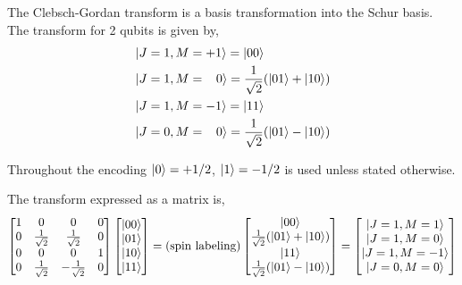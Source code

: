 \documentclass[12pt]{article}
\begin{document}
The Clebsch-Gordan transform is a basis transformation into the Schur basis. The transform for 2 qubits is given by,
\begin{subequations}
\begin{align}
\begin{split}
&\left\vert{J=1, M=+1}\right\rangle = \left\vert{00}\right\rangle \\
&\left\vert{J=1, M=\;\;\;0}\right\rangle = \frac{1}{\sqrt{2}}(\left\vert{01}\right\rangle + \left\vert{10}\right\rangle) \\
&\left\vert{J=1, M=-1}\right\rangle = \left\vert{11}\right\rangle \\
\end{split}\\
\begin{split}
&\left\vert{J=0, M=\;\;\;0}\right\rangle = \frac{1}{\sqrt{2}}(\left\vert{01}\right\rangle - \left\vert{10}\right\rangle)\\
\end{split}
\end{align}
\end{subequations}

Throughout the encoding $\left\vert{0}\right\rangle=+1/2$, $\left\vert{1}\right\rangle=-1/2$ is used unless stated otherwise.

The transform expressed as a matrix is,
\begin{align}
\begin{bmatrix}
1 & 0 & 0 & 0 \\
0 & \frac{1}{\sqrt{2}} & \frac{1}{\sqrt{2}} & 0 \\
0 & 0 & 0 & 1 \\
0 & \frac{1}{\sqrt{2}} & -\frac{1}{\sqrt{2}} & 0 \\
\end{bmatrix}
\begin{bmatrix}
\left\vert{00}\right\rangle \\
\left\vert{01}\right\rangle \\
\left\vert{10}\right\rangle \\
\left\vert{11}\right\rangle \\ 
\end{bmatrix}
= \text{(spin labeling)}
\begin{bmatrix}
\left\vert{00}\right\rangle \\
\frac{1}{\sqrt{2}}(\left\vert{01}\right\rangle + \left\vert{10}\right\rangle) \\
\left\vert{11}\right\rangle \\
\frac{1}{\sqrt{2}}(\left\vert{01}\right\rangle - \left\vert{10}\right\rangle) \\ 
\end{bmatrix}
=
\begin{bmatrix}
\left\vert{J=1, M=1}\right\rangle \\
\left\vert{J=1, M=0}\right\rangle \\
\left\vert{J=1, M=-1}\right\rangle \\
\left\vert{J=0, M=0}\right\rangle \\ 
\end{bmatrix}
\end{align}
\end{document}

